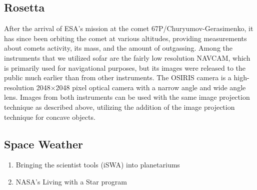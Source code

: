 \documentclass{vgtc}                %
\begin{document}
\subsection*{Rosetta}
After the arrival of ESA's mission at the comet 67P/Churyumov-Gerasimenko, it has since been orbiting the comet at various altitudes, providing measurements about comets activity, its mass, and the amount of outgassing. Among the instruments that we utilized sofar are the fairly low resolution NAVCAM, which is primarily used for navigational purposes, but its images were released to the public much earlier than from other instruments. The OSIRIS camera is a high-resolution 2048$\times$2048 pixel optical camera with a narrow angle and wide angle lens. Images from both instruments can be used with the same image projection technique as described above, utilizing the addition of the image projection technique for concave objects.  

\subsection*{Space Weather}
\begin{enumerate}
\item Bringing the scientist tools (iSWA) into planetariums
\item NASA's Living with a Star program
\end{enumerate}





\end{document}
